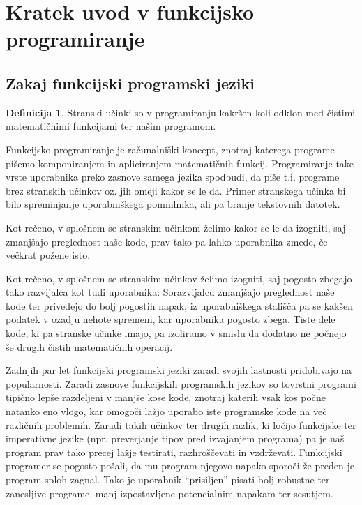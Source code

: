\documentclass[12pt,a4paper]{amsart}
\theoremstyle{definition} %
\newtheorem{definicija}{Definicija}[section]
\theoremstyle{plain} %
\begin{document}
\section{Kratek uvod v funkcijsko programiranje}

\subsection{Zakaj funkcijski programski jeziki}

\begin{definicija}
Stranski učinki so v programiranju kakršen koli odklon med čistimi matematičnimi funkcijami ter našim programom.
\end{definicija}

Funkcijsko programiranje je računalniški koncept, znotraj katerega programe pišemo komponiranjem in apliciranjem matematičnih funkcij. Programiranje take vrste uporabnika preko zasnove samega jezika spodbudi, da piše t.i. programe brez stranskih učinkov oz. jih omeji kakor se le da. Primer stranskega učinka bi bilo spreminjanje uporabniškega pomnilnika, ali pa branje tekstovnih datotek.

Kot rečeno, v splošnem se stranskim učinkom želimo kakor se le da izogniti, saj zmanjšajo preglednost naše kode, prav tako pa lahko uporabnika zmede, če večkrat požene isto. 

Kot rečeno, v splošnem se stranskim učinkov želimo izogniti, saj pogosto zbegajo tako razvijalca kot tudi uporabnika: Sorazvijalcu zmanjšajo preglednost naše kode ter privedejo do bolj pogostih napak, iz uporabniškega stališča pa se kakšen podatek v ozadju nehote spremeni, kar uporabnika pogosto zbega. Tiste dele kode, ki pa stranske učinke imajo, pa izoliramo v smislu da dodatno ne počnejo še drugih čistih matematičnih operacij.


Zadnjih par let funkcijski programski jeziki zaradi svojih lastnosti pridobivajo na popularnosti. Zaradi zasnove funkcijskih programskih jezikov so tovrstni programi tipično lepše razdeljeni v manjše kose kode, znotraj katerih vsak kos počne natanko eno vlogo, kar omogoči lažjo uporabo iste programske kode na več različnih problemih. Zaradi takih učinkov ter drugih razlik, ki ločijo funkcijske ter imperativne jezike (npr. preverjanje tipov pred izvajanjem programa) pa je naš program prav tako precej lažje testirati, razhroščevati in vzdrževati. Funkcijski programer se pogosto pošali, da mu program njegovo napako sporoči že preden je program sploh zagnal. Tako je uporabnik ``prisiljen'' pisati bolj robustne ter zanesljive programe, manj izpostavljene potencialnim napakam ter sesutjem.
\end{document}

